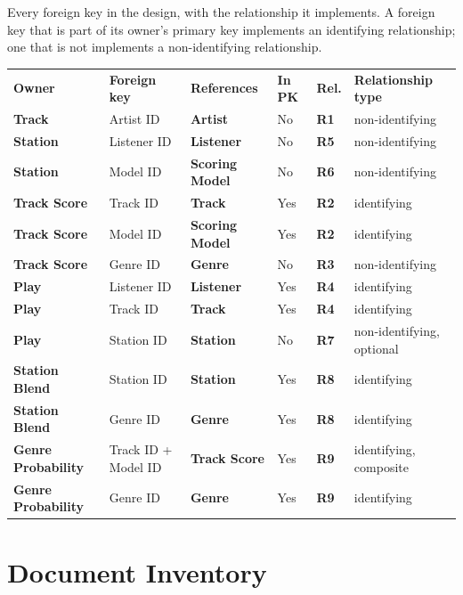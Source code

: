 \documentclass[11pt]{article}
\newcommand{\ent}[1]{\textcolor{entc}{\textbf{#1}}}
\newcommand{\asc}[1]{\textcolor{ascc}{\textbf{#1}}}
\newcommand{\rel}[1]{\textcolor{relc}{\textbf{#1}}}
\begin{document}
Every foreign key in the design, with the relationship it implements. A foreign key that is part of
its owner's primary key implements an identifying relationship; one that is not implements a
non-identifying relationship.

\begin{longtable}{|L{1.15in}|L{1.00in}|L{1.10in}|L{0.55in}|L{0.40in}|L{1.70in}|}
\hline
{} \\ \hline
{}\textbf{Owner} & \textbf{Foreign key} & \textbf{References} & \textbf{In PK} & \textbf{Rel.} & \textbf{Relationship type} \\ \hline
\ent{Track} & Artist ID & \ent{Artist} & No & \rel{R1} & non-identifying \\ \hline
\ent{Station} & Listener ID & \ent{Listener} & No & \rel{R5} & non-identifying \\ \hline
\ent{Station} & Model ID & \ent{Scoring Model} & No & \rel{R6} & non-identifying \\ \hline
\asc{Track Score} & Track ID & \ent{Track} & Yes & \rel{R2} & identifying \\ \hline
\asc{Track Score} & Model ID & \ent{Scoring Model} & Yes & \rel{R2} & identifying \\ \hline
\asc{Track Score} & Genre ID & \ent{Genre} & No & \rel{R3} & non-identifying \\ \hline
\asc{Play} & Listener ID & \ent{Listener} & Yes & \rel{R4} & identifying \\ \hline
\asc{Play} & Track ID & \ent{Track} & Yes & \rel{R4} & identifying \\ \hline
\asc{Play} & Station ID & \ent{Station} & No & \rel{R7} & non-identifying, optional \\ \hline
\asc{Station Blend} & Station ID & \ent{Station} & Yes & \rel{R8} & identifying \\ \hline
\asc{Station Blend} & Genre ID & \ent{Genre} & Yes & \rel{R8} & identifying \\ \hline
\asc{Genre Probability} & Track ID + Model ID & \asc{Track Score} & Yes & \rel{R9} & identifying, composite \\ \hline
\asc{Genre Probability} & Genre ID & \ent{Genre} & Yes & \rel{R9} & identifying \\ \hline
\end{longtable}

\clearpage
\section{Document Inventory}\label{sec:inv}
\end{document}
